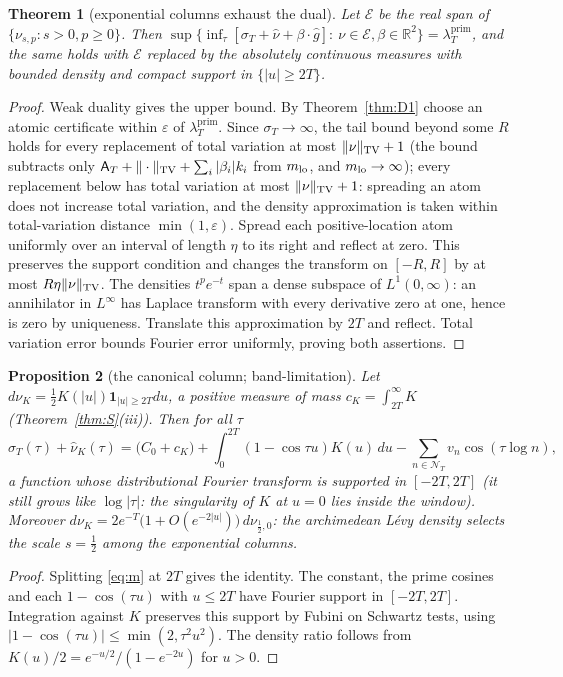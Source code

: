 \documentclass[10pt]{amsart}
\newtheorem{theorem}{Theorem}[section]
\newtheorem{proposition}[theorem]{Proposition}
\theoremstyle{definition}
\theoremstyle{remark}
\newcommand{\R}{\mathbb R}
\newcommand{\lamP}{\lambda^{\mathrm{prim}}_T}
\newcommand{\sT}{\sigma_T}
\newcommand{\nuh}{\widehat\nu}
\newcommand{\NT}{\mathcal N_T}
\newcommand{\Aconst}{\mathsf A_T}
\begin{document}
\begin{theorem}[exponential columns exhaust the dual]\label{thm:E}
Let $\mathcal E$ be the real span of $\{\nu_{s,p}:s>0,p\ge0\}$. Then
$\sup\{\inf_\tau[\sT+\nuh+\beta\cdot\widehat g]:\ \nu\in\mathcal E,\beta\in\R^2\}=\lamP$, and the same
holds with $\mathcal E$ replaced by the absolutely continuous measures with bounded density and
compact support in $\{|u|\ge2T\}$.
\end{theorem}
\begin{proof}
Weak duality gives the upper bound. By Theorem~\ref{thm:D1} choose an
atomic certificate within $\varepsilon$ of $\lamP$. Since $\sT\to\infty$,
the tail bound beyond some $R$ holds for every replacement of total variation at most
$\|\nu\|_{\rm TV}+1$ (the bound subtracts only $\Aconst+\|\cdot\|_{\rm TV}+\sum_i|\beta_i|k_i$ from
$m_{\rm lo}$, and $m_{\rm lo}\to\infty$); every replacement below has total variation at most
$\|\nu\|_{\rm TV}+1$: spreading an atom does not increase total variation, and the
density approximation is taken within total-variation distance $\min(1,\varepsilon)$. Spread each positive-location atom uniformly over an
interval of length $\eta$ to its right and reflect at zero. This preserves
the support condition and changes the transform on $[-R,R]$ by at most
$R\eta\|\nu\|_{\rm TV}$. The densities $t^pe^{-t}$ span a dense subspace
of $L^1(0,\infty)$: an annihilator in $L^\infty$ has Laplace transform
with every derivative zero at one, hence is zero by uniqueness.
Translate this approximation by $2T$ and reflect. Total variation error
bounds Fourier error uniformly, proving both assertions.
\end{proof}


\begin{proposition}[the canonical column; band-limitation]\label{prop:M}
Let $d\nu_K=\frac12K(|u|)\mathbf 1_{|u|\ge2T}du$, a positive measure of mass
$c_K=\int_{2T}^\infty K$ (Theorem~\ref{thm:S}(iii)). Then for all $\tau$
\[
\sT(\tau)+\nuh_K(\tau)=\big(C_0+c_K\big)+\int_0^{2T}(1-\cos\tau u)K(u)\,du-\sum_{n\in\NT}v_n\cos(\tau\log n),
\]
a function whose distributional Fourier transform is supported in $[-2T,2T]$ (it still grows
like $\log|\tau|$: the singularity of $K$ at $u=0$ lies inside the window). Moreover
$d\nu_K=2e^{-T}\big(1+O(e^{-2|u|})\big)\,d\nu_{\frac12,0}$:
the archimedean L\'evy density selects the scale $s=\frac12$ among the exponential columns.
\end{proposition}
\begin{proof}
Splitting \eqref{eq:m} at $2T$ gives the identity. The constant,
the prime cosines and each $1-\cos(\tau u)$ with $u\le2T$ have
Fourier support in $[-2T,2T]$. Integration against $K$ preserves
this support by Fubini on Schwartz tests, using
$|1-\cos(\tau u)|\le\min(2,\tau^2u^2)$. The density ratio follows
from $K(u)/2=e^{-u/2}/(1-e^{-2u})$ for $u>0$.
\end{proof}
\end{document}

